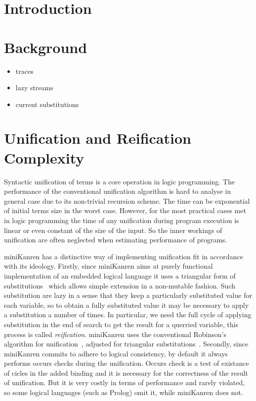 \documentclass[acmsmall, anonymous, review]{acmart}
\newcommand{\mK}{miniKanren\xspace}
\begin{document}
\maketitle

\section{Introduction}

\section{Background}

\begin{itemize}
    \item traces
    \item lazy streams
    \item current substitutions
\end{itemize}



\section{Unification and Reification Complexity}

Syntactic unification of terms is a core operation in logic programming. The performance of the  conventional unification algorithm is hard to analyse in general case due to its non-trivial recursion scheme. The time can be exponential of initial terms size in the worst case. However, for the most practical cases met in logic programming the time of any unification during program execution is linear or even constant of the size of the input. So the inner workings of unification are often neglected when estimating performance of programs.

\mK has a distinctive way of implementing unification fit in accordance with its ideology. Firstly, since \mK aims at purely functional implementation of an embedded logical language it uses a triangular form of substitutions~\cite{UnificationTheory} which allows simple extension in a non-mutable fashion. Such substitution are lazy in a sense that they keep a particularly substituted value for each variable, so to obtain a fully substituted value it may be necessary to apply a substitution a number of times. In particular, we need the full cycle of applying substitution in the end of search to get the result for a querried variable, this process is called \emph{reification}. \mK uses the conventional Robinson's algorithm for unification~\cite{UnificationTheory}, adjusted for triangular substitutions~\cite{TRS}. Secondly, since \mK commits to adhere to logical consistency, by default it always performs occurs checks during the unification. Occurs check is a test of existance of cicles in the added binding and it is necessary for the correctness of the result of unification. But it is very costly in terms of performance and rarely violated, so some logical languages (such as Prolog) omit it, while \mK does not.
\end{document}
